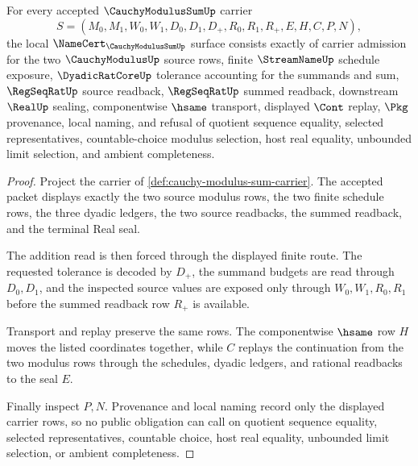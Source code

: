\begin{theorem}
\label{thm:cauchy-modulus-sum-namecert-obligations}
For every accepted $\CauchyModulusSumUp$ carrier
$$
S=(M_0,M_1,W_0,W_1,D_0,D_1,D_+,R_0,R_1,R_+,E,H,C,P,N),
$$
the local $\NameCert_{\CauchyModulusSumUp}$ surface consists exactly of carrier admission for the two $\CauchyModulusUp$ source rows, finite $\StreamNameUp$ schedule exposure, $\DyadicRatCoreUp$ tolerance accounting for the summands and sum, $\RegSeqRatUp$ source readback, $\RegSeqRatUp$ summed readback, downstream $\RealUp$ sealing, componentwise $\hsame$ transport, displayed $\Cont$ replay, $\Pkg$ provenance, local naming, and refusal of quotient sequence equality, selected representatives, countable-choice modulus selection, host real equality, unbounded limit selection, and ambient completeness.
\end{theorem}
\begin{proof}
Project the carrier of \autoref{def:cauchy-modulus-sum-carrier}. The accepted packet displays exactly the two source modulus rows, the two finite schedule rows, the three dyadic ledgers, the two source readbacks, the summed readback, and the terminal Real seal.

The addition read is then forced through the displayed finite route. The requested tolerance is decoded by $D_+$, the summand budgets are read through $D_0,D_1$, and the inspected source values are exposed only through $W_0,W_1,R_0,R_1$ before the summed readback row $R_+$ is available.

Transport and replay preserve the same rows. The componentwise $\hsame$ row $H$ moves the listed coordinates together, while $C$ replays the continuation from the two modulus rows through the schedules, dyadic ledgers, and rational readbacks to the seal $E$.

Finally inspect $P,N$. Provenance and local naming record only the displayed carrier rows, so no public obligation can call on quotient sequence equality, selected representatives, countable choice, host real equality, unbounded limit selection, or ambient completeness.
\end{proof}



